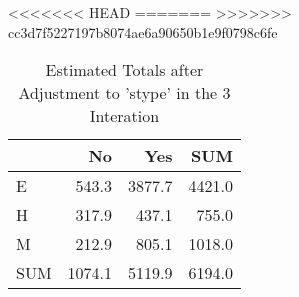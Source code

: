 <<<<<<< HEAD
=======
>>>>>>> cc3d7f5227197b8074ae6a90650b1e9f0798c6fe
\begin{table}[ht]
\centering
\caption{Estimated Totals after Adjustment to 'stype' in the 3 Interation} 
\begin{tabular}{l|rr|r}
  & No & Yes & SUM \\ 
  \hline
E & 543.3 & 3877.7 & 4421.0 \\ 
  H & 317.9 & 437.1 & 755.0 \\ 
  M & 212.9 & 805.1 & 1018.0 \\ 
   \hline
SUM & 1074.1 & 5119.9 & 6194.0 \\ 
  \end{tabular}
\end{table}
